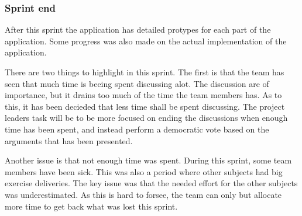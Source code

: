\subsubsection{Sprint end}
After this sprint the application has detailed protypes for each part of the application.  Some progress was also made on the actual implementation of the application.

There are two things to highlight in this sprint. The first is that the team has seen that much time is beeing spent discussing alot. The discussion are of importance, but it drains too much of the time the team members has. As to this, it has been decieded that less time shall be spent discussing. The project leaders task will be to be more focused on ending the discussions when enough time has been spent, and instead perform a democratic vote based on the arguments that has been presented. 

Another issue is that not enough time was spent. During this sprint, some team  members have been sick. This was also a period where other subjects had big exercise deliveries. The key issue was that the needed effort for the other subjects was underestimated. As this is hard to forsee, the team can only but allocate more time to get back what was lost this sprint.